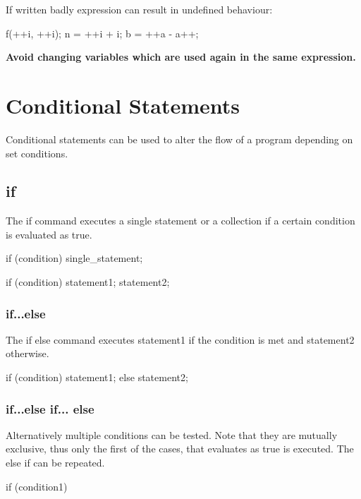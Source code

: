 \documentclass[10pt,a4paper]{scrartcl}
\begin{document}
\begin{multicols*}{2}
If written badly expression can result in undefined behaviour:

\begin{TPCpp}
f(++i, ++i);
n = ++i + i;
b = ++a - a++;
\end{TPCpp}

\textbf{Avoid changing variables which are used again in the same expression.}

\columnbreak
\section{Conditional Statements}
\label{sec:ConditionalStatements}

Conditional statements can be used to alter the flow of a program depending on set conditions.

\subsection{if}
\label{sec:If}

The if command executes a single statement or a collection if a certain condition is evaluated as true.

\begin{TPCpp}
if (condition) single_statement;

if (condition) {
	statement1;
	statement2;
}
\end{TPCpp} 

\subsubsection{if...else}
\label{sec:IfElse}

The if else command executes statement1 if the condition is met and statement2 otherwise.

\begin{TPCpp}
if (condition) {
	statement1;
}
else {
	statement2;
}
\end{TPCpp} 

\subsubsection{if...else if... else}
\label{sec:IfElseIfElse}

Alternatively multiple conditions can be tested. Note that they are mutually exclusive, thus only the first of the cases, that evaluates as true is executed. The else if can be repeated.

\begin{TPCpp}
if (condition1) {

}
\end{TPCpp}
\end{multicols*}
\end{document}
